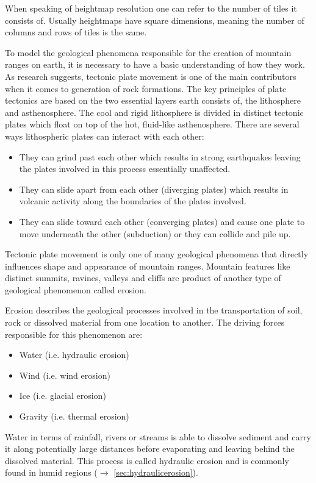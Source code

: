 \documentclass[11pt,a4paper,twoside,openright]{report}
\begin{document}
When speaking of heightmap resolution one can refer to the number of tiles it consists of. Usually heightmaps have square dimensions, meaning the number of columns and rows of tiles is the same.

To model the geological phenomena responsible for the creation of mountain ranges on earth, it is necessary to have a basic understanding of how they work. As research suggests, tectonic plate movement is one of the main contributors when it comes to generation of rock formations. The key principles of plate tectonics are based on the two essential layers earth consists of, the lithosphere and asthenosphere. The cool and rigid lithosphere is divided in distinct tectonic plates which float on top of the hot, fluid-like asthenosphere. There are several ways lithospheric plates can interact with each other:
\begin{itemize}
  \item They can grind past each other which results in strong earthquakes leaving the plates involved in this process essentially unaffected.
  \item They can slide apart from each other (diverging plates) which results in volcanic activity along the  boundaries of the plates involved.
  \item They can slide toward each other (converging plates) and cause one plate to move underneath the other (subduction) or they can collide and pile up.
\end{itemize}
Tectonic plate movement is only one of many geological phenomena that directly influences shape and appearance of mountain ranges. Mountain features like distinct summits, ravines, valleys and cliffs are product of another type of geological phenomenon called erosion.

Erosion describes the geological processes involved in the transportation of soil, rock or dissolved material from one location to another. The driving forces responsible for this phenomenon are:
\begin{itemize}
  \item Water (i.e. hydraulic erosion)
  \item Wind (i.e. wind erosion)
  \item Ice (i.e. glacial erosion)
  \item Gravity (i.e. thermal erosion)
\end{itemize}

Water in terms of rainfall, rivers or streams is able to dissolve sediment and carry it along potentially large distances before evaporating and leaving behind the dissolved material. This process is called hydraulic erosion and is commonly found in humid regions ($\rightarrow$ \cref{sec:hydraulicerosion}).
\end{document}
